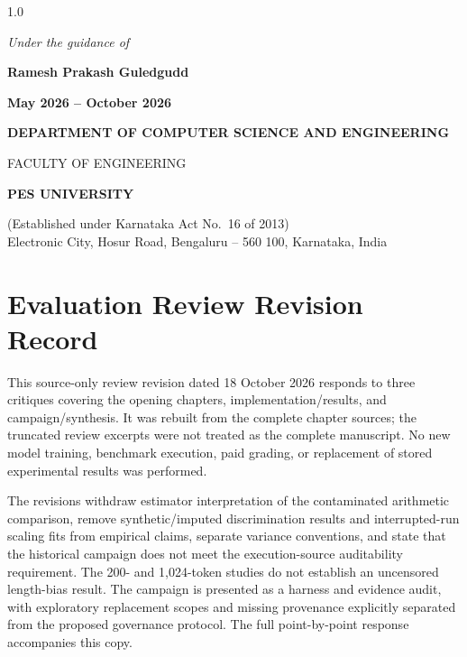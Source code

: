 \begin{titlepage}
\begin{spacing}{1.0}
\vspace{0.5em}
{\normalsize\itshape Under the guidance of\par}
\vspace{0.2em}
{\large\bfseries Ramesh Prakash Guledgudd\par}

\vspace{0.6em}
{\normalsize\bfseries\color{pesmaroon} May 2026 -- October 2026\par}

\vfill

{\normalsize\bfseries DEPARTMENT OF COMPUTER SCIENCE AND ENGINEERING\par}
{\normalsize FACULTY OF ENGINEERING\par}
{\large\bfseries PES UNIVERSITY\par}
{\footnotesize (Established under Karnataka Act No.\ 16 of 2013)\\
Electronic City, Hosur Road, Bengaluru -- 560 100, Karnataka, India\par}
\end{spacing}
\end{titlepage}



\chapter*{Evaluation Review Revision Record}
This source-only review revision dated 18 October 2026 responds to three critiques covering the opening chapters, implementation/results, and campaign/synthesis. It was rebuilt from the complete chapter sources; the truncated review excerpts were not treated as the complete manuscript. No new model training, benchmark execution, paid grading, or replacement of stored experimental results was performed.

The revisions withdraw estimator interpretation of the contaminated arithmetic comparison, remove synthetic/imputed discrimination results and interrupted-run scaling fits from empirical claims, separate variance conventions, and state that the historical campaign does not meet the execution-source auditability requirement. The 200- and 1,024-token studies do not establish an uncensored length-bias result. The campaign is presented as a harness and evidence audit, with exploratory replacement scopes and missing provenance explicitly separated from the proposed governance protocol. The full point-by-point response accompanies this copy.

